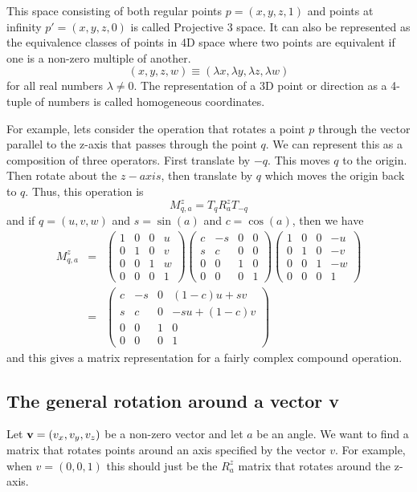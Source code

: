 \documentclass{book}
\newcommand{\vect}[1]{{\bf{ #1}}}
\begin{document}
This space consisting of both regular points $p=(x,y,z,1)$ and points at infinity $p'=(x,y,z,0)$ is called
Projective 3 space. It can also be represented as the equivalence classes of points in 4D space where two
points are equivalent if one is a non-zero multiple of another.
\[
(x,y,z,w) \equiv (\lambda x, \lambda y, \lambda z, \lambda w)
\]
for all real numbers $\lambda \ne 0$. The representation of a 3D point or direction as a 4-tuple of numbers
is called homogeneous coordinates.

For example, lets consider the operation that rotates a point $p$ through the vector parallel to the z-axis that passes through the point $q$.
We can represent this as a composition of three operators. First translate by $-q$. This moves $q$ to the origin. Then rotate about the
$z-axis$, then translate by $q$ which moves the origin back to $q$. Thus, this operation is
\[
M^z_{q,a} = T_q R^z_a T_{-q}
\]
and if $q=(u,v,w)$ and $s = \sin(a)$ and $c=\cos(a)$, then we have
\begin{eqnarray*}
M^z_{q,a} &=&
\left (
\begin{array}{cccc}
1 & 0 & 0 & u \\
0 & 1 & 0 & v \\
0 & 0 & 1 & w \\
0 & 0 & 0 & 1
\end{array}
\right )
\left (
\begin{array}{cccc}
c & -s & 0 & 0 \\
s & c & 0 & 0 \\
0 & 0 & 1 & 0 \\
0 & 0 & 0 & 1
\end{array}
\right )
\left (
\begin{array}{cccc}
1 & 0 & 0 & -u \\
0 & 1 & 0 & -v \\
0 & 0 & 1 & -w \\
0 & 0 & 0 & 1
\end{array}
\right ) \\
&=&
\left (
\begin{array}{cccc}
c & -s & 0 & (1-c)u + sv \\
s & c & 0 & -su + (1-c)v \\
0 & 0 & 1 & 0 \\
0 & 0 & 0 & 1
\end{array}
\right )
\end{eqnarray*}
and this gives a matrix representation for a fairly complex compound operation.

\subsection{The general rotation around a vector v}
Let $\vect{v} = (v_x, v_y, v_z)$ be a non-zero vector and let $a$ be an angle. We want to find a matrix
that rotates points around an axis specified by the vector $v$. For example, when $v=(0,0,1)$ this should
just be the $R^z_a$ matrix that rotates around the z-axis.
\end{document}
